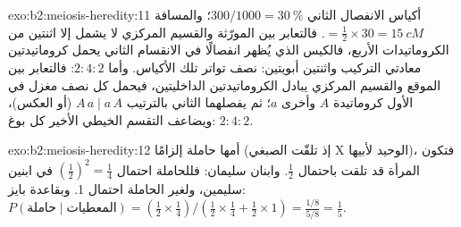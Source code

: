 \begin{solution}{exo:b2:meiosis-heredity:11}
أكياس الانفصال الثاني $300/1000 = \qty{30}{\%}$؛ والمسافة $=
\tfrac12\times 30 = \qty{15}{cM}$. فالتعابر بين المورّثة والقسيم
المركزي لا يشمل إلا اثنتين من الكروماتيدات الأربع، فالكيس الذي
يُظهر انفصالًا في الانقسام الثاني يحمل كروماتيدتين معادتي التركيب
واثنتين أبويتين:  نصف تواتر تلك الأكياس. وأما
$2 : 4 : 2$: فالتعابر بين الموقع والقسيم المركزي يبادل الكروماتيدتين
الداخليتين، فيحمل كل نصف مغزل في  الأول كروماتيدة
$A$ وأخرى $a$؛ ثم يفصلهما  الثاني بالترتيب $A\,a \mid
a\,A$ (أو العكس)، ويضاعف التقسم الخيطي الأخير كل بوغ:
$2 : 4 : 2$.
\end{solution}

\begin{solution}{exo:b2:meiosis-heredity:12}
أمها حاملة إلزامًا (إذ تلقّت الصبغي X الوحيد لأبيها)، فتكون المرأة
قد تلقت  باحتمال $\tfrac12$.
وابنان سليمان: فللحاملة احتمال $(\tfrac12)^2 = \tfrac14$
في ابنين سليمين، ولغير الحاملة احتمال 1. وبقاعدة بايز:
$P(\text{حاملة}\mid\text{المعطيات}) = (\tfrac12\times\tfrac14)/(\tfrac12
\times\tfrac14 + \tfrac12\times 1) = \tfrac{1/8}{5/8} = \tfrac15$.
\end{solution}

